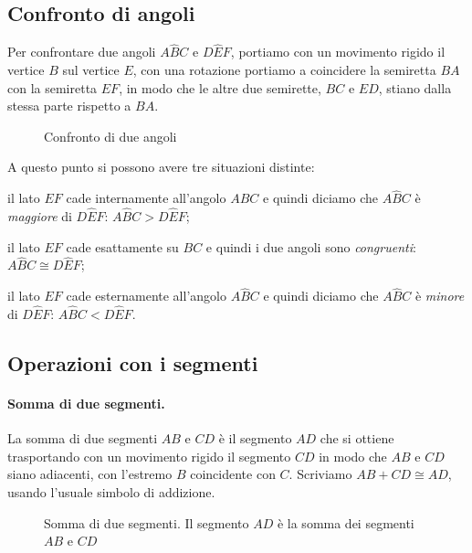 \subsection{Confronto di angoli}

Per confrontare due angoli $A\widehat{B}C$ e $D\widehat{E}F$, 
portiamo con un movimento rigido il vertice $B$ sul vertice $E$, con 
una rotazione portiamo a coincidere la semiretta $BA$ con la 
semiretta $EF$, in modo che le altre due semirette, $BC$ e $ED$, 
stiano dalla stessa parte rispetto a $BA$.


\begin{inaccessibleblock}
 \begin{figure}[htb]
\centering
\caption{Confronto di due angoli}
\end{figure}
\end{inaccessibleblock}

A questo punto si possono avere tre situazioni distinte:
\begin{itemize*}
\item il lato $EF$ cade internamente all'angolo $A\widehat{B}C$ e 
quindi diciamo che $A\widehat{B}C$ è \emph{maggiore} di 
$D\widehat{E}F$: $A\widehat{B}C>D\widehat{E}F$;
\item il lato $EF$ cade esattamente su $BC$ e quindi i due angoli 
sono \emph{congruenti}: $A\widehat{B}C\cong D\widehat{E}F$;
\item il lato $EF$ cade esternamente all'angolo $A\widehat{B}C$ e 
quindi diciamo che $A\widehat{B}C$ è \emph{minore} di 
$D\widehat{E}F$: $A\widehat{B}C<D\widehat{E}F$.
\end{itemize*}

\subsection{Operazioni con i segmenti}

\paragraph{Somma di due segmenti.} La somma di due segmenti $AB$ e 
$CD$ è il segmento $AD$ che si ottiene trasportando con un movimento 
rigido il segmento $CD$ in modo che $AB$ e $CD$ siano adiacenti, con 
l'estremo $B$ coincidente con $C$. Scriviamo $AB + CD \cong AD$, 
usando l'usuale simbolo di addizione.


\begin{inaccessibleblock}
 \begin{figure}[htb]
\centering
\caption{Somma di due segmenti. Il segmento $AD$ è la somma dei 
segmenti $AB$ e $CD$}
\end{figure}
\end{inaccessibleblock}


